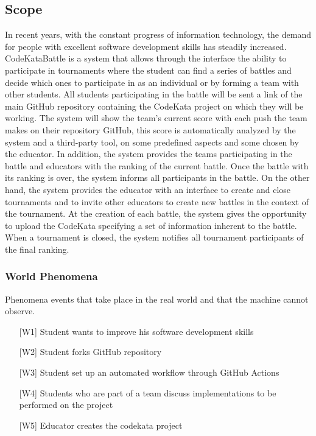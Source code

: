 \subsection{Scope}
In recent years, with the constant progress of information technology, the demand for
people with excellent software development skills has steadily increased.
\newline
CodeKataBattle is a system that allows through the interface the ability to participate
in tournaments where the student can find a series of battles and decide which ones to
participate in as an individual or by forming a team with other students.
\newline
All students participating in the battle will be sent a link of the main GitHub repository containing the CodeKata project on which they will be working.
\newline
The system will show the team's current score with each push the team makes on their repository GitHub, this score is automatically analyzed by the system and a third-party tool, on some predefined aspects and some chosen by the educator.
\newline
In addition, the system provides the teams participating in the battle and educators with
the ranking of the current battle. Once the battle with its ranking is over, the system
informs all participants in the battle.
\newline
On the other hand, the system provides the educator with an interface to create and close tournaments and to invite other educators to create new battles in the context of the tournament.
\newline
At the creation of each battle, the system gives the opportunity to upload the CodeKata specifying a set of information inherent to the battle.
\newline
When a tournament is closed, the system notifies all tournament participants of the final ranking.


\vspace{0.5\baselineskip}
\subsubsection{World Phenomena}
Phenomena events that take place in the real world and that the machine cannot observe.
\begin{itemize}[left=20pt]
    \setlength{\itemsep}{0pt}
    \setlength{\parskip}{0pt}
    \setlength{\parsep}{0pt}
    \setlength{\partopsep}{0pt}
    \setlength{\topsep}{0pt}
    \item [{[W1]}] Student wants to improve his software development skills
    \item [{[W2]}] Student forks GitHub repository
    \item [{[W3]}] Student set up an automated workflow through GitHub Actions
    \item [{[W4]}] Students who are part of a team discuss implementations to be performed on the project
    \item [{[W5]}] Educator creates the codekata project
\end{itemize}



